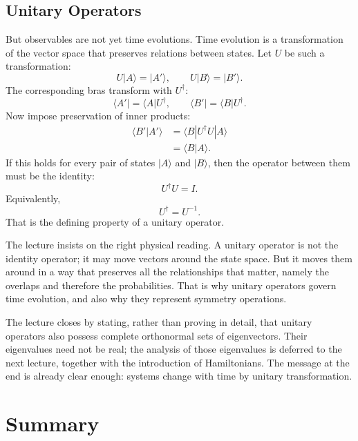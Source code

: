 \subsection{Unitary Operators}

But observables are not yet time evolutions. Time evolution is a transformation of the vector space that preserves relations between states. Let $U$ be such a transformation:
\begin{equation}
U|A\rangle=|A'\rangle,
\qquad
U|B\rangle=|B'\rangle.
\end{equation}
The corresponding bras transform with $U^\dagger$:
\begin{equation}
\langle A'|=\langle A|U^\dagger,
\qquad
\langle B'|=\langle B|U^\dagger.
\end{equation}
Now impose preservation of inner products:
\begin{align}
\langle B'|A'\rangle
&=
\langle B|U^\dagger U|A\rangle \\
&=
\langle B|A\rangle.
\end{align}
If this holds for every pair of states $|A\rangle$ and $|B\rangle$, then the operator between them must be the identity:
\begin{equation}
U^\dagger U=I.
\end{equation}
Equivalently,
\begin{equation}
U^\dagger=U^{-1}.
\end{equation}
That is the defining property of a unitary operator.

The lecture insists on the right physical reading. A unitary operator is not the identity operator; it may move vectors around the state space. But it moves them around in a way that preserves all the relationships that matter, namely the overlaps and therefore the probabilities. That is why unitary operators govern time evolution, and also why they represent symmetry operations.

The lecture closes by stating, rather than proving in detail, that unitary operators also possess complete orthonormal sets of eigenvectors. Their eigenvalues need not be real; the analysis of those eigenvalues is deferred to the next lecture, together with the introduction of Hamiltonians. The message at the end is already clear enough: systems change with time by unitary transformation.

\section{Summary}

